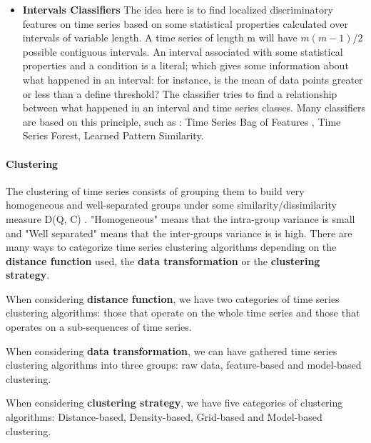 \begin{itemize}
\item \textbf{Intervals Classifiers} The idea here is to find localized discriminatory features on time series based on some statistical properties calculated over intervals of variable length. A time series of length m will have $ m(m-1)/2$ possible contiguous intervals. An interval associated with some statistical properties and a condition is a literal; which gives some information about what happened in an interval: for instance, is the mean of data points greater or less than a define threshold? The classifier tries to find a relationship between what happened in an interval and  time series classes. Many classifiers are based on this principle, such as : Time Series Bag of Features \cite{baydogan2013bag}, Time Series Forest\cite{deng2013time}, Learned Pattern Similarity\cite{baydogan2016time}.
\end{itemize}


\paragraph{Clustering}
The clustering of time series consists of grouping them to build very homogeneous and well-separated groups under some similarity/dissimilarity measure D(Q, C) \cite{rani2012recent}. "Homogeneous" means that the intra-group variance is small and "Well separated" means that the inter-groups variance is is high. There are many ways to categorize time series clustering algorithms depending on the \textbf{distance function} used, the \textbf{data transformation} or  the \textbf{clustering strategy}. 


When considering \textbf{distance function}, we have two categories of time series clustering algorithms: those that operate on the whole time series and those that operates on a sub-sequences of time series.


 When considering \textbf{data transformation}, we can have gathered time series clustering algorithms into three groups:  raw data, feature-based and model-based clustering. 


When considering \textbf{clustering strategy}, we have five categories of clustering algorithms: Distance-based, Density-based, Grid-based and Model-based clustering. 


